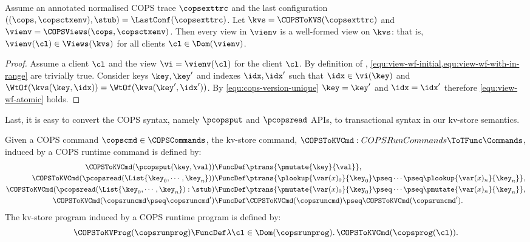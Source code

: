 \begin{toappendix}
\label{sec:cops-well-formed-encoded-view}
\begin{proposition}
\label{prop:cops-well-formed-view}
Assume an annotated normalised COPS trace \( \copsexttrc \) and the last configuration \( ((\cops, \copsctxenv),\stub) = \LastConf(\copsexttrc) \).
Let \( \kvs = \COPSToKVS(\copsexttrc) \) and \( \vienv = \COPSViews(\cops, \copsctxenv) \).
Then every view in \( \vienv \) is a well-formed view on \( \kvs \):
that is, \( \vienv(\cl) \in \Views(\kvs) \) for all clients \( \cl \in \Dom(\vienv) \).
\end{proposition}
\begin{proof}
Assume a client \( \cl \) and the view \( \vi = \vienv(\cl) \) for the client \( \cl \).
By definition of \COPSViews, \cref{equ:view-wf-initial,equ:view-wf-with-in-range} are trivially true.
Consider keys \( \key,\key' \) and indexes \( \idx,\idx' \) 
such that \( \idx \in \vi(\key) \) and \( \WtOf(\kvs(\key,\idx)) = \WtOf(\kvs(\key',\idx')) \).
By \cref{equ:cops-version-unique} \( \key = \key' \) and \( \idx = \idx' \)
therefore \cref{equ:view-wf-atomic} holds.
\end{proof}
\end{toappendix}

Last, it is easy to convert the COPS syntax, namely \( \pcopsput\) and \( \pcopsread \) APIs,
to transactional syntax in our kv-store semantics.

\begin{definition}
Given a COPS command \( \copscmd \in \COPSCommands \),
the kv-store command, \( \COPSToKVCmd : COPSRunCommands \ToTFunc \Commands \),
induced by a COPS runtime command is defined by:
\begin{align*}
   \COPSToKVCmd(\pcopsput(\key,\val)) & \FuncDef \ptrans{ \pmutate{\key}{\val} } ,
\\ \COPSToKVCmd(\pcopsread(\List{\key_0, \cdots, \key_n })) 
        & \FuncDef \ptrans{ \plookup{\var(x)_0}{\key_0} \pseq \cdots \pseq \plookup{\var(x)_n}{\key_n}  } ,
\\ \COPSToKVCmd(\pcopsread(\List{\key_0, \cdots, \key_n }) : \stub) 
        & \FuncDef \ptrans{ \pmutate{\var(x)_0}{\key_0} \pseq \cdots \pseq \pmutate{\var(x)_n}{\key_n}  } ,
\\ \COPSToKVCmd(\copsruncmd \pseq \copsruncmd' ) 
        & \FuncDef \COPSToKVCmd(\copsruncmd) \pseq \COPSToKVCmd(\copsruncmd') .
\end{align*}                                                                 
The kv-store program induced by a COPS runtime program is defined by:
\[
    \COPSToKVProg(\copsrunprog) \FuncDef \lambda \cl \in \Dom(\copsrunprog) \ldotp \COPSToKVCmd(\copsprog(\cl)) .
\]
\end{definition}

